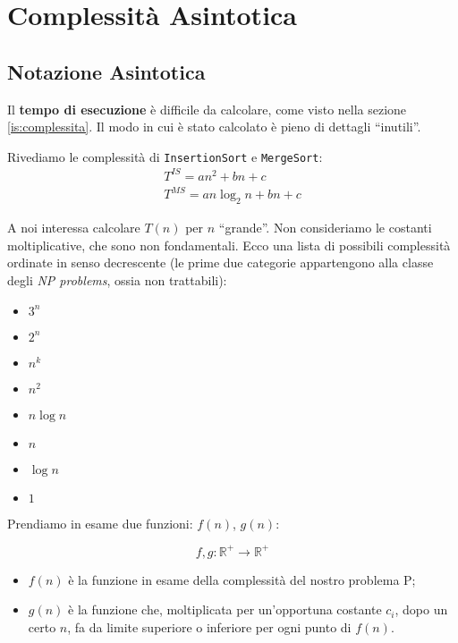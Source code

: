 \section{Complessità Asintotica}

\subsection{Notazione Asintotica}
Il \textbf{tempo di esecuzione} è difficile da calcolare, come visto nella sezione \ref{is:complessita}. 
Il modo in cui è stato calcolato è pieno di dettagli ``inutili''.\par
Rivediamo le complessità di \texttt{InsertionSort} e \texttt{MergeSort}:
\begin{gather*}
	T^{IS} = an^2 + bn + c \\
	T^{MS} = an \log_2 n + bn + c
\end{gather*}

A noi interessa calcolare $T(n)$ per $n$ ``grande''. Non consideriamo le costanti moltiplicative, che sono non fondamentali. Ecco una lista di possibili complessità ordinate in senso decrescente (le prime due categorie appartengono alla classe degli \emph{NP problems}, ossia non trattabili):

\begin{itemize}[noitemsep]
	\item $3^n$
	\item $2^n$
	\medskip
	\item $n^k$
	\item $n^2$
	\item $n \log n$
	\item $n$
	\item $\log n$
	\item $1$
\end{itemize}

Prendiamo in esame due funzioni: $f(n)$, $g(n)$:

\begin{displaymath}
f, g: \mathbb{R}^+ \rightarrow \mathbb{R}^+
\end{displaymath}

\begin{itemize}
	\item $f(n)$ è la funzione in esame della complessità del nostro problema P;
	\item $g(n)$ è la funzione che, moltiplicata per un'opportuna costante $c_i$, dopo un certo $n$, fa da 
	limite superiore o inferiore per ogni punto di $f(n)$.
\end{itemize}
\newpage
